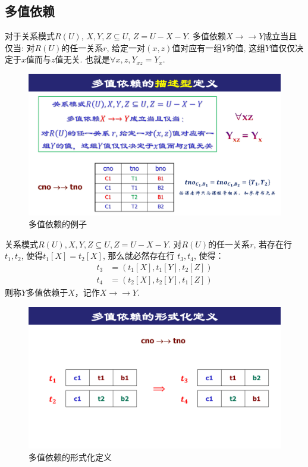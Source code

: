 \subsection{多值依赖}

\begin{definition}[多值依赖的描述型定义]
  对于关系模式$R(U)$, $X,Y,Z\subseteq U$, $Z=U-X-Y$. 多值依赖$X\to\to Y$成立当且仅当:
  对$R(U)$的任一关系$r$, 给定一对$(x,z)$值对应有一组$Y$的值, 这组$Y$值仅仅决定于$x$值而与$z$值无关. 也就是$\forall x,z, Y_{xz} = Y_x$.
\end{definition}

\begin{figure}[H]
    \centering
    \includegraphics[width=.4\textwidth]{./figure/多值依赖.pdf}
    \caption{多值依赖的例子}
\end{figure}

\begin{definition}[多值依赖的形式化定义]
  关系模式$R(U), X, Y, Z \subseteq U, Z = U - X - Y$.
  对$R(U)$的任一关系$r$, 若存在行$t_1, t_2$, 使得$t_1[X] = t_2[X]$,
  那么就必然存在行 $t_3, t_4$, 使得：
  \begin{align*}
    t_3 &= (t_1[X], t_1[Y], t_2[Z]) \\
    t_4 &= (t_2[X], t_2[Y], t_1[Z]) 
  \end{align*}
  则称$Y$多值依赖于$X$，记作$X \to\to Y$.
\end{definition}

\begin{figure}[H]
    \centering
    \includegraphics[width=.7\textwidth]{./figure/多值依赖的形式化定义.pdf}
    \caption{多值依赖的形式化定义}
\end{figure}

